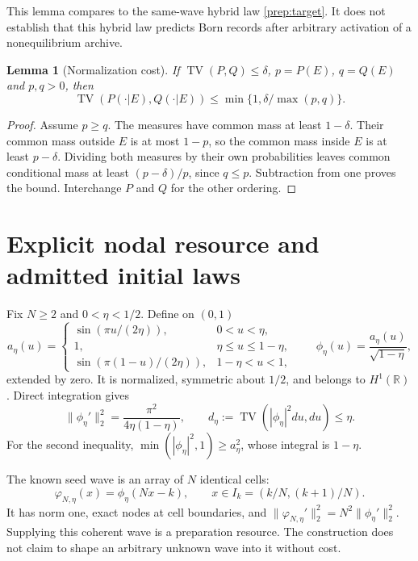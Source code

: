 \documentclass[11pt,oneside,openany]{book}
\newtheorem{lemma}[theorem]{Lemma}
\theoremstyle{definition}
\theoremstyle{remark}\newtheorem{remark}[theorem]{Remark}
\begin{document}
This lemma compares to the same-wave hybrid law
\eqref{prep:target}. It does not establish that this hybrid law predicts
Born records after arbitrary activation of a nonequilibrium archive.

\begin{lemma}[Normalization cost]\label{prep:condition}
If $\operatorname{TV}(P,Q)\le\delta$, $p=P(E)$, $q=Q(E)$ and $p,q>0$, then
\[
 \operatorname{TV}(P(\cdot|E),Q(\cdot|E))
       \le\min\{1,\delta/\max(p,q)\}.
\]
\end{lemma}
\begin{proof}
Assume $p\ge q$. The measures have common mass at least $1-\delta$.
Their common mass outside $E$ is at most $1-p$, so the common mass
inside $E$ is at least $p-\delta$. Dividing both measures by their
own probabilities leaves common conditional mass at least
$(p-\delta)/p$, since $q\le p$. Subtraction from one proves the bound.
Interchange $P$ and $Q$ for the other ordering.
\end{proof}

\section{Explicit nodal resource and admitted initial laws}

Fix $N\ge2$ and $0<\eta<1/2$. Define on $(0,1)$
\[
 a_\eta(u)=
 \begin{cases}
 \sin(\pi u/(2\eta)),&0<u<\eta,\\
 1,&\eta\le u\le1-\eta,\\
 \sin(\pi(1-u)/(2\eta)),&1-\eta<u<1,
 \end{cases}
 \qquad \phi_\eta(u)=\frac{a_\eta(u)}{\sqrt{1-\eta}},
\]
extended by zero. It is normalized, symmetric about $1/2$, and belongs to
$H^1(\mathbb R)$. Direct integration gives
\begin{equation}
 \|\phi_\eta'\|_2^2=\frac{\pi^2}{4\eta(1-\eta)},\qquad
 d_\eta:=\operatorname{TV}(|\phi_\eta|^2du,du)\le\eta.
 \label{prep:packet}
\end{equation}
For the second inequality, $\min(|\phi_\eta|^2,1)\ge a_\eta^2$,
whose integral is $1-\eta$.

The known seed wave is an array of $N$ identical cells:
\begin{equation}
 \varphi_{N,\eta}(x)=\phi_\eta(Nx-k),\qquad
 x\in I_k=(k/N,(k+1)/N).
 \label{prep:seed}
\end{equation}
It has norm one, exact nodes at cell boundaries, and
$\|\varphi_{N,\eta}'\|_2^2=N^2\|\phi_\eta'\|_2^2$.
Supplying this coherent wave is a preparation resource. The construction
does not claim to shape an arbitrary unknown wave into it without cost.
\end{document}
